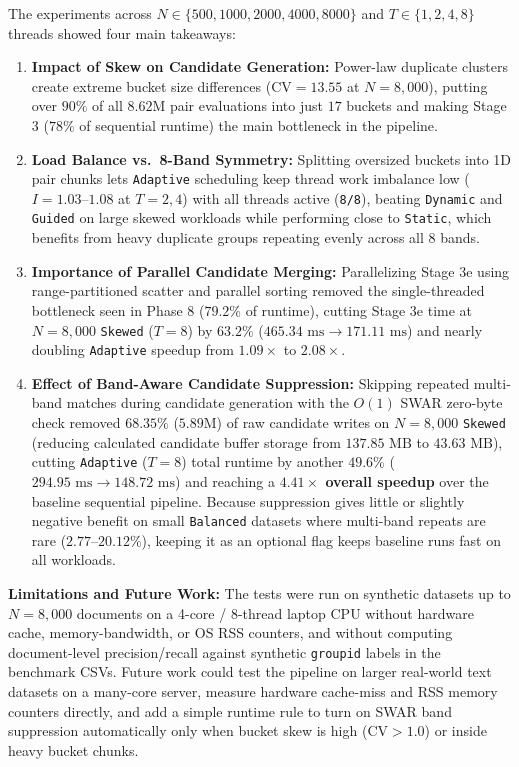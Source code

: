 \documentclass[11pt,a4paper]{article}
\renewcommand{\_}{\textunderscore\allowbreak}
\begin{document}
The experiments across $N \in \{500, 1000, 2000, 4000, 8000\}$ and $T \in \{1, 2, 4, 8\}$ threads showed four main takeaways:
\begin{enumerate}
    \item \textbf{Impact of Skew on Candidate Generation:} Power-law duplicate clusters create extreme bucket size differences ($\text{CV} = 13.55$ at $N=8,000$), putting over $90\%$ of all $8.62\text{M}$ pair evaluations into just $17$ buckets and making Stage 3 ($78\%$ of sequential runtime) the main bottleneck in the pipeline.
    \item \textbf{Load Balance vs.\ 8-Band Symmetry:} Splitting oversized buckets into 1D pair chunks lets \texttt{Adaptive} scheduling keep thread work imbalance low ($I = 1.03\text{--}1.08$ at $T=2, 4$) with all threads active (\texttt{8/8}), beating \texttt{Dynamic} and \texttt{Guided} on large skewed workloads while performing close to \texttt{Static}, which benefits from heavy duplicate groups repeating evenly across all 8 bands.
    \item \textbf{Importance of Parallel Candidate Merging:} Parallelizing Stage 3e using range-partitioned scatter and parallel sorting removed the single-threaded bottleneck seen in Phase 8 ($79.2\%$ of runtime), cutting Stage 3e time at $N=8,000$ \texttt{Skewed} ($T=8$) by $63.2\%$ ($465.34\text{ ms} \to 171.11\text{ ms}$) and nearly doubling \texttt{Adaptive} speedup from $1.09\times$ to $2.08\times$.
    \item \textbf{Effect of Band-Aware Candidate Suppression:} Skipping repeated multi-band matches during candidate generation with the $O(1)$ SWAR zero-byte check removed $68.35\%$ ($5.89\text{M}$) of raw candidate writes on $N=8,000$ \texttt{Skewed} (reducing calculated candidate buffer storage from $137.85\text{ MB}$ to $43.63\text{ MB}$), cutting \texttt{Adaptive} ($T=8$) total runtime by another $49.6\%$ ($294.95\text{ ms} \to 148.72\text{ ms}$) and reaching a \textbf{$4.41\times$ overall speedup} over the baseline sequential pipeline. Because suppression gives little or slightly negative benefit on small \texttt{Balanced} datasets where multi-band repeats are rare ($2.77\text{--}20.12\%$), keeping it as an optional flag keeps baseline runs fast on all workloads.
\end{enumerate}

\textbf{Limitations and Future Work:} The tests were run on synthetic datasets up to $N = 8,000$ documents on a 4-core / 8-thread laptop CPU without hardware cache, memory-bandwidth, or OS RSS counters, and without computing document-level precision/recall against synthetic \texttt{group\_id} labels in the benchmark CSVs. Future work could test the pipeline on larger real-world text datasets on a many-core server, measure hardware cache-miss and RSS memory counters directly, and add a simple runtime rule to turn on SWAR band suppression automatically only when bucket skew is high ($\text{CV} > 1.0$) or inside heavy bucket chunks.
\end{document}
